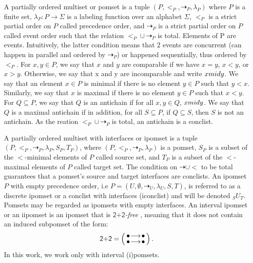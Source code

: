 \documentclass[11pt,a4paper,oldfontcommands]{memoir}
\makeatletter
\newcommand*\twotwo{\textsf{2+2}}
\newcommand*\subid[3]{{}_{#1}#2_{#3}}
\newcommand\pomsetwop[4]{%
  \vcenter{\xymatrix@1@R=#1@C=#2@M=#3{#4}}%
}
\newcommand\pomset[2][1.3]{%
  \left(%
    \pomsetwop{0ex}{#1em}{2pt}{#2}%
  \right)%
}
\makeatother
\begin{document}
A partially ordered multiset or pomset is a tuple $(P, <_P,\dashrightarrow_P,\lambda_P )$ where $P$ is a finite set, $\lambda_{P}: P \rightarrow \Sigma$ is a labeling function over an alphabet $\Sigma$, $<_{P}$ is a strict partial order on $P$ called precedence order, and $\dashrightarrow_P$ is a strict partial order on $P$ called event order such that the relation $<_P \cup \dashrightarrow_P$ is total. Elements of P are events. Intuitively, the latter condition means that 2 events are concurrent (can happen in parallel and ordered by $\dashrightarrow_P$) or happened sequentially, thus ordered by $<_P$.
For $x,y \in P$, we say that $x$ and $y$ are comparable if we have $x=y$, $x<y$, or $x>y$. Otherwise, we say that x and y are incomparable and write $x \\mid y$. We say that an element $x \in P$ is minimal if there is no element $y \in P$ such that $y<x$. Similarly, we say that $x$ is maximal if there is no element $y \in P$ such that $x<y$. For $Q \subseteq P$, we say that $Q$ is an antichain if for all $x,y \in Q$, $x \\mid y$. We say that $Q$ is a maximal antichain if in addition, for all $S\subseteq P$, if $Q \subseteq S$, then $S$ is not an antichain. As the reation $<_P \cup \dashrightarrow_P$ is total, an antichain is a conclist.

A partially ordered multiset with interfaces or ipomset is a tuple \linebreak $\left(P,<_{P}, \dashrightarrow_{P}, \lambda_{P}, S_{P}, T_{P}\right)$, where $(P, <_P, \dashrightarrow_P,\lambda_P )$ is a pomset, $S_{P}$ is a subset of the $<$-minimal elements of $P$ called source set, and $T_{P}$ is a subset of the $<$-maximal elements of $P$ called target set. The condition on $\dashrightarrow \cup <$ to be total guarantees that a pomset's source and target interfaces are conclists. An ipomset $P$ with empty precedence order, i.e $P=\left(U,\emptyset, \dashrightarrow_{U}, \lambda_{U}, S, T\right)$, is referred to as a discrete ipomset or a conclist with interfaces (iconclist) and will be denoted $\subid{S}{U}{T}$. Pomsets may be regarded as ipomsets with empty interfaces. An interval ipomset or an iipomset is an ipomset that is \emph{$\twotwo$-free} \cite{fishburn1970intransitive}, meaning that it does not contain an induced subpomset of the form:
\begin{equation*}
  \twotwo= \pomset{\bullet \ar[r] & \bullet \\ \bullet \ar[r] & \bullet}.
\end{equation*}
In this work, we work only with interval (i)pomsets. 
\end{document}
